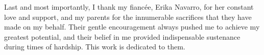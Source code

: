 
Last and most importantly, I thank my fianc\'ee, Erika Navarro, for her constant love and support, and my parents for the innumerable sacrifices that they have made on my behalf.
Their gentle encouragement always pushed me to achieve my greatest potential, and their belief in me provided indispensable sustenance during times of hardship. 
This work is dedicated to them.
